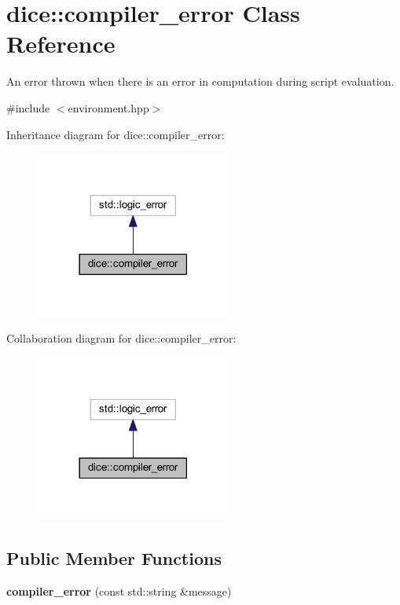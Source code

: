 \hypertarget{classdice_1_1compiler__error}{}\section{dice\+:\+:compiler\+\_\+error Class Reference}
\label{classdice_1_1compiler__error}


An error thrown when there is an error in computation during script evaluation.  




{\ttfamily \#include $<$environment.\+hpp$>$}



Inheritance diagram for dice\+:\+:compiler\+\_\+error\+:\nopagebreak
\begin{figure}[H]
\begin{center}
\leavevmode
\includegraphics[width=182pt]{classdice_1_1compiler__error__inherit__graph}
\end{center}
\end{figure}


Collaboration diagram for dice\+:\+:compiler\+\_\+error\+:\nopagebreak
\begin{figure}[H]
\begin{center}
\leavevmode
\includegraphics[width=182pt]{classdice_1_1compiler__error__coll__graph}
\end{center}
\end{figure}
\subsection*{Public Member Functions}
\begin{DoxyCompactItemize}
\item 
\mbox{\label{classdice_1_1compiler__error_addf72d1445219a85eb03321721a78bdf}} 
{\bfseries compiler\+\_\+error} (const std\+::string \&message)
\end{DoxyCompactItemize}


